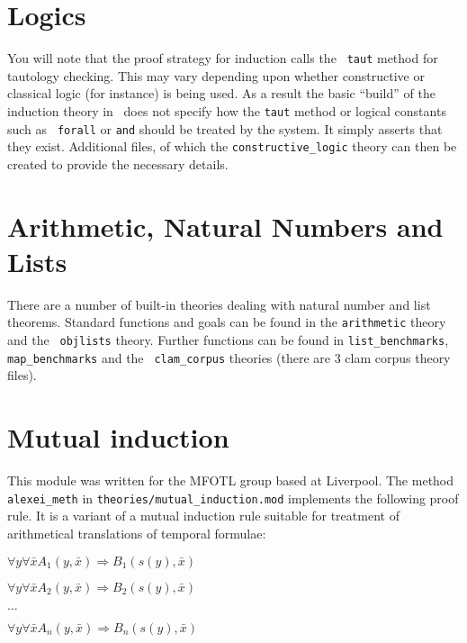 \section{Logics}
You will note that the proof strategy for induction calls the {\tt
  taut} method for tautology checking.  This may vary
depending upon whether constructive or classical logic (for instance)
is being used.  As a result the basic ``build'' of the induction
theory in \lclam\ does not specify how the
{\tt taut} method or logical constants such as {\tt
  forall} or {\tt and} should be treated by
the system.  It simply asserts that they exist.  Additional files, of
which the {\tt constructive\_logic} theory
can then be created to provide the necessary details.

\section{Arithmetic, Natural Numbers and Lists}
There are a number of built-in theories dealing with natural number
and list theorems.  Standard functions and goals can be found in the
{\tt arithmetic} theory and the {\tt
  objlists} theory.  Further functions can be found in 
{\tt list\_benchmarks}, {\tt
  map\_benchmarks} and the {\tt
  clam\_corpus} theories (there are 3 clam corpus
theory files).

\section{Mutual induction}
\noindent 
This module was written for the MFOTL group based at Liverpool.  The
method \texttt{alexei\_meth} in
\texttt{theories/mutual\_induction.mod} implements the following proof
rule.  It is a variant of a mutual induction rule suitable for
treatment of arithmetical translations of temporal formulae:

\vspace{0.5cm}

$ \forall y \forall \bar{x} A_{1}(y, \bar{x}) \Rightarrow B_{1}(s(y), \bar{x})$

$\forall y \forall \bar{x} A_{2}(y, \bar{x}) \Rightarrow B_{2}(s(y), \bar{x})$

$\ldots $

$\forall y \forall \bar{x} A_{n}(y, \bar{x}) \Rightarrow B_{n}(s(y), \bar{x})$


